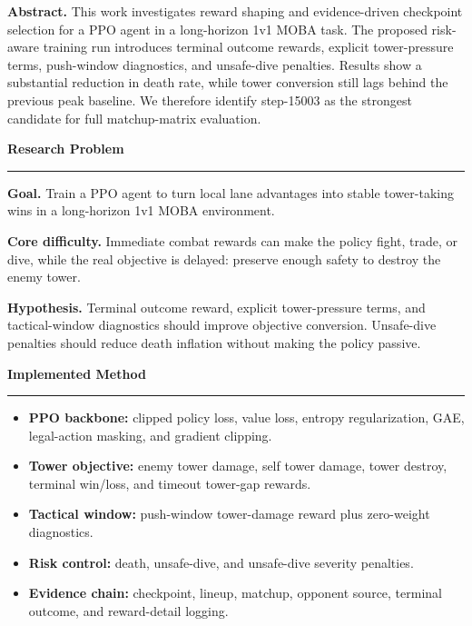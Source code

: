 \documentclass[final]{article}
\newcommand{\BlockTitle}[1]{%
  {\fontsize{36}{42}\selectfont\bfseries\color{ink}#1}\par
  \vspace{0.26cm}
  {\color{rule}\rule{\linewidth}{1.9pt}}\par
  \vspace{0.62cm}
}
\newcommand{\PosterBlock}[2]{%
  \begin{minipage}[t]{\linewidth}
    \BlockTitle{#1}
    {\fontsize{25.5}{32}\selectfont\color{ink}\RaggedRight #2}
  \end{minipage}
}
\begin{document}
\vspace*{29.0cm}
\hspace*{4.8cm}
\begin{minipage}[t]{70.4cm}

{\fontsize{26.5}{34}\selectfont\color{ink}\RaggedRight
\textbf{Abstract.} This work investigates reward shaping and evidence-driven checkpoint selection for a PPO agent in a long-horizon 1v1 MOBA task. The proposed risk-aware training run introduces terminal outcome rewards, explicit tower-pressure terms, push-window diagnostics, and unsafe-dive penalties. Results show a substantial reduction in death rate, while tower conversion still lags behind the previous peak baseline. We therefore identify step-15003 as the strongest candidate for full matchup-matrix evaluation.}

\vspace{1.7cm}

\begin{minipage}[t]{21.8cm}
\PosterBlock{Research Problem}{
\textbf{Goal.} Train a PPO agent to turn local lane advantages into stable tower-taking wins in a long-horizon 1v1 MOBA environment.

\vspace{0.72cm}
\textbf{Core difficulty.} Immediate combat rewards can make the policy fight, trade, or dive, while the real objective is delayed: preserve enough safety to destroy the enemy tower.

\vspace{0.72cm}
\textbf{Hypothesis.} Terminal outcome reward, explicit tower-pressure terms, and tactical-window diagnostics should improve objective conversion. Unsafe-dive penalties should reduce death inflation without making the policy passive.
}

\vspace{2.05cm}

\PosterBlock{Implemented Method}{
\begin{itemize}
  \item \textbf{PPO backbone:} clipped policy loss, value loss, entropy regularization, GAE, legal-action masking, and gradient clipping.
  \item \textbf{Tower objective:} enemy tower damage, self tower damage, tower destroy, terminal win/loss, and timeout tower-gap rewards.
  \item \textbf{Tactical window:} push-window tower-damage reward plus zero-weight diagnostics.
  \item \textbf{Risk control:} death, unsafe-dive, and unsafe-dive severity penalties.
  \item \textbf{Evidence chain:} checkpoint, lineup, matchup, opponent source, terminal outcome, and reward-detail logging.
\end{itemize}

}
\end{minipage}
\end{minipage}
\end{document}
